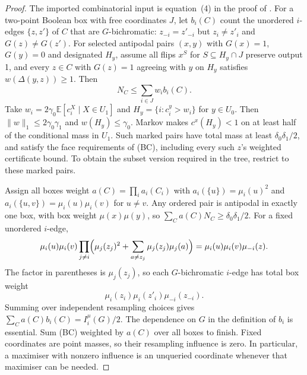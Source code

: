 \documentclass[11pt]{article}
\theoremstyle{definition}\newtheorem{definition}[theorem]{Definition}
\theoremstyle{remark}\newtheorem{remark}[theorem]{Remark}
\newcommand{\E}{\mathbb E}\newcommand{\Prb}{\mathbb P}
\begin{document}
\begin{proof}
The imported combinatorial input is equation~(4) in the proof of \cite[Lemma~4]{HMP26}. For a two-point Boolean box with free coordinates \(J\), let \(b_i(C)\) count the unordered \(i\)-edges \(\{z,z'\}\) of \(C\) that are \(G\)-bichromatic: \(z_{-i}=z'_{-i}\) but \(z_i\ne z'_i\) and \(G(z)\ne G(z')\). For selected antipodal pairs \((x,y)\) with \(G(x)=1\), \(G(y)=0\) and designated \(H_y\), assume all flips \(x^S\) for \(S\subseteq H_y\cap J\) preserve output 1, and every \(z\in C\) with \(G(z)=1\) agreeing with \(y\) on \(H_y\) satisfies \(w(\Delta(y,z))\ge1\). Then
\[
 N_C\le\sum_{i\in J}w_ib_i(C).
 \tag{BC}
\]
Take \(w_i=2\gamma_0\E[c^X_i\mid X\in U_1]\) and \(H_y=\{i:c^y_i>w_i\}\) for \(y\in U_0\). Then \(\|w\|_1\le2\gamma_0\gamma_1\) and \(w(H_y)\le\gamma_0\). Markov makes \(c^x(H_y)<1\) on at least half of the conditional mass in \(U_1\). Such marked pairs have total mass at least \(\delta_0\delta_1/2\), and satisfy the face requirements of (BC), including every such \(z\)'s weighted certificate bound. To obtain the subset version required in the tree, restrict to these marked pairs.

Assign all boxes weight \(a(C)=\prod_ia_i(C_i)\) with \(a_i(\{u\})=\mu_i(u)^2\) and \(a_i(\{u,v\})=\mu_i(u)\mu_i(v)\) for \(u\ne v\). Any ordered pair is antipodal in exactly one box, with box weight \(\mu(x)\mu(y)\), so \(\sum_Ca(C)N_C\ge\delta_0\delta_1/2\). For a fixed unordered \(i\)-edge,
\[
 \mu_i(u)\mu_i(v)\prod_{j\ne i}\Bigl(\mu_j(z_j)^2+\sum_{a\ne z_j}\mu_j(z_j)\mu_j(a)\Bigr)=\mu_i(u)\mu_i(v)\mu_{-i}(z).
\]
The factor in parentheses is \(\mu_j(z_j)\), so each \(G\)-bichromatic \(i\)-edge has total box weight
\[
 \mu_i(z_i)\mu_i(z'_i)\mu_{-i}(z_{-i}).
\]
Summing over independent resampling choices gives \(\sum_Ca(C)b_i(C)=I^\mu_i(G)/2\). The dependence on \(G\) in the definition of \(b_i\) is essential. Sum (BC) weighted by \(a(C)\) over all boxes to finish. Fixed coordinates are point masses, so their resampling influence is zero. In particular, a maximiser with nonzero influence is an unqueried coordinate whenever that maximiser can be needed.
\end{proof}
\end{document}
